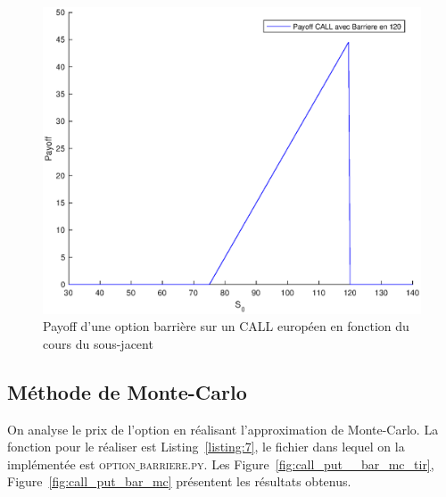 \begin{figure}[H]
\centering
\includegraphics[scale=0.5]{./img/CALL_BAR_PAYOFF.eps}
\caption{Payoff d'une option barrière sur un CALL européen  en fonction du cours du sous-jacent}
\label{fig:call_bar_payoff}
\end{figure}

\subsection{Méthode de Monte-Carlo} %

\label{sub:methode_de_monte_carlo}

On analyse le prix de l'option en réalisant l'approximation de Monte-Carlo. La fonction pour le réaliser est Listing~\ref{listing:7}, le fichier dans lequel on la implémentée est \textsc{option$\_$barriere.py}. Les Figure~\ref{fig:call_put__bar_mc_tir}, Figure~\ref{fig:call_put_bar_mc} présentent les résultats obtenus.

